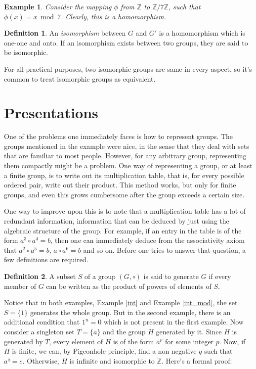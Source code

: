 \documentclass[12pt, titlepage]{article}
\newtheorem{exmp}[thm]{Example}
\theoremstyle{definition}
\newtheorem{defn}{Definition}[section]
\begin{document}
\begin{exmp}
Consider the mapping $\phi$ from $\mathbb{Z}$ to $\mathbb{Z}/7\mathbb{Z}$, such that $\phi(x) = x \bmod 7$. Clearly, this is a homomorphism.
\end{exmp}

\begin{defn}
An \emph{isomorphism} between $G$ and $G'$ is a homomorphism which is one-one and onto. If an isomorphism exists between two groups, they are said to be isomorphic.
\end{defn}

For all practical purposes, two isomorphic groups are same in every aspect, so it's common to treat isomorphic groups as equivalent.

\section{Presentations}

One of the problems one immediately faces is how to represent groups. The groups mentioned in the example were nice, in the sense that they deal with sets that are familiar to most people. However, for any arbitrary group, representing them compactly might be a problem. One way of representing a group, or at least a finite group, is to write out its multiplication table, that is, for every possible ordered pair, write out their product. This method works, but only for finite groups, and even this grows cumbersome after the group exceeds a certain size.

One way to improve upon this is to note that a multiplication table has a lot of redundant information, information that can be deduced by just using the algebraic structure of the group. For example, if an entry in the table is of the form $a^3 \circ a^4 = b$, then one can immediately deduce from the associativity axiom that $a^2 \circ a^5 = b$, $a \circ a^6 = b$ and so on. Before one tries to answer that question, a few definitions are required. \cite{johnson}

\begin{defn}
A subset $S$ of a group $(G, \circ)$ is said to generate $G$ if every member of $G$ can be written as the product of powers of elements of $S$.
\end{defn}

Notice that in both examples, Example \autoref{int} and Example \autoref{int_mod}, the set $S = \{1\}$ generates the whole group. But in the second example, there is an additional condition that $1^n=0$ which is not present in the first example. Now consider a singleton set $T = \{a\}$ and the group $H$ generated by it. Since $H$ is generated by $T$, every element of $H$ is of the form $a^p$ for some integer $p$. Now, if $H$ is finite, we can, by Pigeonhole principle, find a non negative $q$ such that $a^q=e$. Otherwise, $H$ is infinite and isomorphic to $\mathbb{Z}$. Here's a formal proof:
\end{document}
